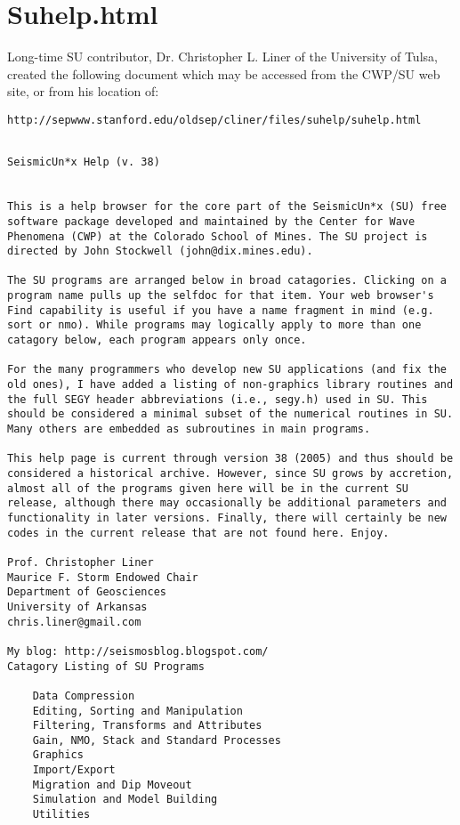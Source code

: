 {{\section{Suhelp.html}
Long-time SU contributor, Dr. Christopher L. Liner of the University
of Tulsa, created the following  document which may be accessed
from the CWP/SU web site, or from his location of:

\begin{verbatim}
http://sepwww.stanford.edu/oldsep/cliner/files/suhelp/suhelp.html
\end{verbatim}

{\small\begin{verbatim}

SeismicUn*x Help (v. 38)
     

This is a help browser for the core part of the SeismicUn*x (SU) free software package developed and maintained by the Center for Wave Phenomena (CWP) at the Colorado School of Mines. The SU project is directed by John Stockwell (john@dix.mines.edu).

The SU programs are arranged below in broad catagories. Clicking on a program name pulls up the selfdoc for that item. Your web browser's Find capability is useful if you have a name fragment in mind (e.g. sort or nmo). While programs may logically apply to more than one catagory below, each program appears only once.

For the many programmers who develop new SU applications (and fix the old ones), I have added a listing of non-graphics library routines and the full SEGY header abbreviations (i.e., segy.h) used in SU. This should be considered a minimal subset of the numerical routines in SU. Many others are embedded as subroutines in main programs.

This help page is current through version 38 (2005) and thus should be considered a historical archive. However, since SU grows by accretion, almost all of the programs given here will be in the current SU release, although there may occasionally be additional parameters and functionality in later versions. Finally, there will certainly be new codes in the current release that are not found here. Enjoy.

Prof. Christopher Liner
Maurice F. Storm Endowed Chair
Department of Geosciences
University of Arkansas
chris.liner@gmail.com

My blog: http://seismosblog.blogspot.com/
Catagory Listing of SU Programs

    Data Compression
    Editing, Sorting and Manipulation
    Filtering, Transforms and Attributes
    Gain, NMO, Stack and Standard Processes
    Graphics
    Import/Export
    Migration and Dip Moveout
    Simulation and Model Building
    Utilities


\end{verbatim}}}}
